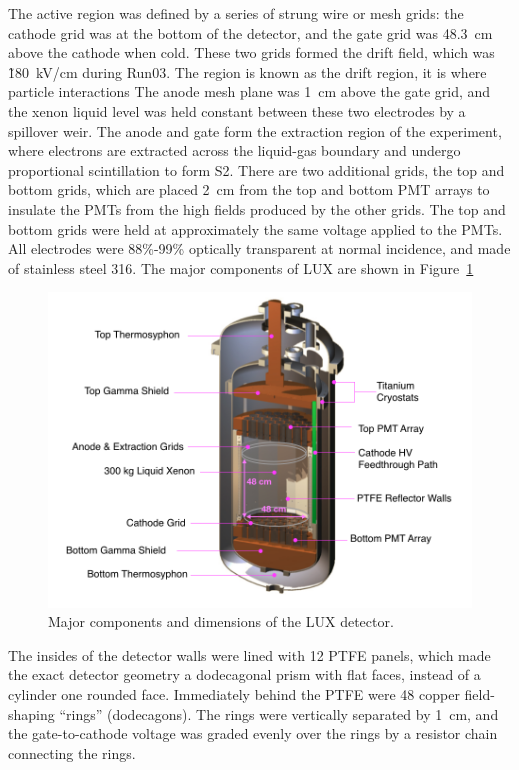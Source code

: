 The active region was defined by a series of strung wire or mesh grids: the cathode grid was at the bottom of the detector, and the gate grid was 48.3~cm above the cathode when cold. These two grids formed the drift field, which was \~180~kV/cm during Run03. The region is known as the drift region, it is where particle interactions The anode mesh plane was 1~cm above the gate grid, and the xenon liquid level was held constant between these two electrodes by a spillover weir. The anode and gate form the extraction region of the experiment, where electrons are extracted across the liquid-gas boundary and undergo proportional scintillation to form S2. There are two additional grids, the top and bottom grids, which are placed 2~cm from the top and bottom \ac{PMT} arrays to insulate the \ac{PMT}s from the high fields produced by the other grids. The top and bottom grids were held at approximately the same voltage applied to the \ac{PMT}s. All electrodes were 88\%-99\% optically transparent at normal incidence, and made of stainless steel 316. The major components of \ac{LUX} are shown in Figure~\ref{fig:lux1}

\begin{figure}[htbp]
\begin{center}
\includegraphics[width=\textwidth]{figures/lux/lux_inner1.png}
\caption{Major components and dimensions of the LUX detector.}
\label{fig:lux1}
\end{center}
\end{figure}


The insides of the detector walls were lined with 12 \ac{PTFE} panels, which made the exact detector geometry a dodecagonal prism with flat faces, instead of a cylinder one rounded face. Immediately behind the \ac{PTFE} were 48 copper field-shaping ``rings'' (dodecagons). The rings were vertically separated by 1~cm, and the gate-to-cathode voltage was graded evenly over the rings by a resistor chain connecting the rings. 

